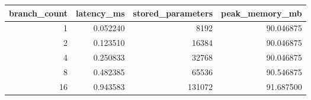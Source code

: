 \begin{tabular}{rrrr}
\toprule
branch_count & latency_ms & stored_parameters & peak_memory_mb \\
\midrule
1 & 0.052240 & 8192 & 90.046875 \\
2 & 0.123510 & 16384 & 90.046875 \\
4 & 0.250833 & 32768 & 90.046875 \\
8 & 0.482385 & 65536 & 90.546875 \\
16 & 0.943583 & 131072 & 91.687500 \\
\bottomrule
\end{tabular}

